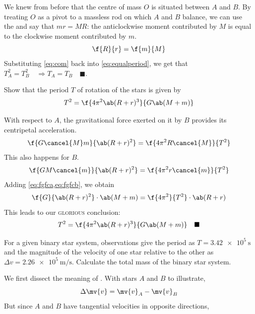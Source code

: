 We knew from before that the centre of mass \(O\) is situated between \(A\) and \(B\).
By treating \(O\) as a pivot to a massless rod on which \(A\) and \(B\) balance, we can use the 
and say that \(mr = MR\): the anticlockwise moment contributed by \(M\) is equal to the clockwise moment contributed by \(m\).
\begin{equation}
	\label{eq:com}
	\f{R}{r} = \f{m}{M}
\end{equation}
Substituting \cref{eq:com} back into \cref{eq:equalperiod}, we get that \(T_A^2 = T_B^2\quad\Rightarrow T_A = T_B\quad\blacksquare\).

\begin{problem}
Show that the period \(T\) of rotation of the stars is given by
\begin{equation*}
	T^2 = \f{4\pi^2 \ab(R+r)^3}{G\ab(M+m)}
\end{equation*}
\end{problem}
With respect to \(A\), the gravitational force exerted on it by \(B\) provides its centripetal acceleration.
\begin{equation}
	\label{eq:fgfca}
	\f{G\cancel{M}m}{\ab(R+r)^2}=\f{4\pi^2 R\cancel{M}}{T^2}
\end{equation}
This also happens for \(B\).
\begin{equation}
	\label{eq:fgfcb}
	\f{GM\cancel{m}}{\ab(R+r)^2}=\f{4\pi^2 r\cancel{m}}{T^2}
\end{equation}
Adding \cref{eq:fgfca,eq:fgfcb}, we obtain
\begin{equation*}
	\f{G}{\ab(R+r)^2}\cdot\ab(M+m) = \f{4\pi^2}{T^2} \cdot \ab(R+r)
\end{equation*}
This leads to our \textsc{glorious} conclusion:
\begin{equation}
	\label{eq:proven}
	T^2 = \f{4\pi^2 \ab(R+r)^3}{G\ab(M+m)}\quad\blacksquare
\end{equation}
\begin{problem}
For a given binary star system, observations give the period as \(T = \qty{3.42e5}{\second}\)
and the magnitude of the velocity of one star relative to the other as \(\Delta v = \qty{2.26e5}{\metre\per\second}\).
Calculate the total mass of the binary star system.
\end{problem}
We first dissect the meaning of . With stars \(A\) and \(B\) to illustrate,
\begin{equation*}
	\Delta\mv{v} = \mv{v}_A - \mv{v}_B
\end{equation*}
But since \(A\) and \(B\) have tangential velocities in opposite directions,
